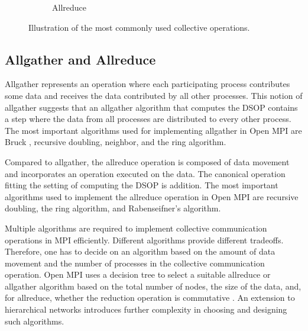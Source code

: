 \documentclass[letterpaper]{article}
\begin{document}
\begin{figure}[htp]
\begin{subfigure}{0.4\linewidth}
        \caption{Allreduce}
        \label{fig:allreduce}
     \end{subfigure}
     \caption{Illustration of the most commonly used collective operations.}
     \label{fig:allgather_allreduce}
\end{figure}


\subsection{Allgather and Allreduce}

Allgather represents an operation where each participating process contributes some data and receives the data contributed by all other processes. This notion of allgather suggests that an allgather algorithm that computes the DSOP contains a step where the data from all processes are distributed to every other process. The most important algorithms used for implementing allgather in Open MPI are Bruck \cite{Bruck:97}, recursive doubling, neighbor, and the ring algorithm. \cite{openMPI_decision_tree_4_0_2, openMPI_decision_tree_4_1_2,Chen:05}

Compared to allgather, the allreduce operation is composed of data movement and incorporates an operation executed on the data. The canonical operation fitting the setting of computing the DSOP is addition. The most important algorithms used to implement the allreduce operation in Open MPI are recursive doubling, the ring algorithm, and Rabenseifner's algorithm. \cite{openMPI_git, openMPI_decision_tree_4_0_2, openMPI_decision_tree_4_1_2, Rabenseifner:05}

Multiple algorithms are required to implement collective communication operations in MPI efficiently. Different algorithms provide different tradeoffs. Therefore, one has to decide on an algorithm based on the amount of data movement and the number of processes in the collective communication operation.
Open MPI uses a decision tree to select a suitable allreduce or allgather algorithm based on the total number of nodes, the size of the data, and, for allreduce, whether the reduction operation is commutative \cite{openMPI_decision_tree_4_0_2, openMPI_decision_tree_4_1_2}.
An extension to hierarchical networks introduces further complexity in choosing and designing such algorithms. \cite{improving_collective_operations_in_MPICH}
\end{document}
